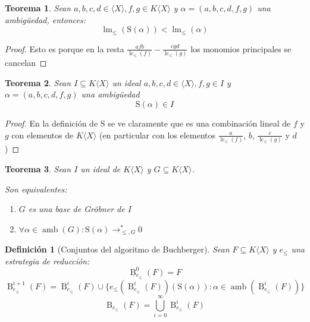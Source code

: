 \documentclass[fleqn]{amsbook} %
\theoremstyle{customstyle}
\newtheorem{definition}{Definición}[section]
\newtheorem{theorem}{Teorema}[section]
\DeclareMathOperator{\lm}{lm}
\DeclareMathOperator{\lc}{lc}
\DeclareMathOperator{\amb}{amb}
\renewcommand{\S}{\text{S}}
\DeclareMathOperator{\B}{B}
\begin{document}
\begin{theorem}
Sean $a, b, c, d ∈ ⟨X⟩, f, g ∈ K⟨X⟩$ y $α = (a, b, c, d, f, g)$ una ambigüedad, entonces:
\[ \lm_≤{(\S(α))} < \lm_≤{(α)} \]
\end{theorem}
\begin{proof}
Esto es porque en la resta $\frac{afb}{\lc_≤{(f)}} - \frac{cgd}{\lc_≤{(g)}}$ los monomios principales se cancelan
\end{proof}

\begin{theorem}\label{thm:S es cerrado en ideal}
Sean $I ⊆ K⟨X⟩$ un ideal $a, b, c, d ∈ ⟨X⟩, f, g ∈ I$ y $α = (a, b, c, d, f, g)$ una ambigüedad
\[ \S(α) ∈ I \]
\end{theorem}
\begin{proof}
En la definición de $\S$ se ve claramente que es una combinación lineal de $f$ y $g$ con elementos de $K⟨X⟩$ (en particular con los elementos $\frac{a}{\lc_≤{(f)}}$, $b$, $\frac{c}{\lc_≤{(g)}}$ y $d$)
\end{proof}

\begin{theorem}\label{thm:equivalencias de base de Gröbner (con ambs)}
Sean $I$ un ideal de $K⟨X⟩$ y $G ⊆ K⟨X⟩$.

Son equivalentes:
\begin{enumerate}
\item $G$ es una base de Gröbner de $I$

\item $∀α ∈ \amb(G) : \S(α) →^*_{≤, G} 0$

\end{enumerate}
\end{theorem}


\begin{definition}[Conjuntos del algoritmo de Buchberger]
Sean $F ⊆ K⟨X⟩$ y $e_≤$ una estrategia de reducción:
\[ \B_{e_≤}^0(F) = F \]
\[ \B_{e_≤}^{i + 1}(F) = \B_{e_≤}^i(F) ∪ \{e_≤(\B_{e_≤}^i(F))(\S(α)) : α ∈ \amb(\B_{e_≤}^i(F))\} \]
\[ \B_{e_≤}(F) = ⋃_{i = 0}^∞ \B_{e_≤}^i(F) \]
\end{definition}
\end{document}
